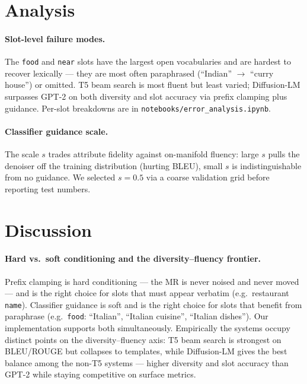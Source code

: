 \documentclass{llncs}
\begin{document}
\section{Analysis}
\label{sec:errors}

\paragraph{Slot-level failure modes.}
The \texttt{food} and \texttt{near} slots have the largest open vocabularies
and are hardest to recover lexically \cite{dusek2019semantic} --- they are
most often paraphrased (``Indian'' $\to$ ``curry house'') or omitted. T5 beam
search is most fluent but least varied; Diffusion-LM surpasses GPT-2 on both
diversity and slot accuracy via prefix clamping plus guidance. Per-slot
breakdowns are in \texttt{notebooks/error\_analysis.ipynb}.

\paragraph{Classifier guidance scale.}
The scale $s$ trades attribute fidelity against on-manifold fluency: large
$s$ pulls the denoiser off the training distribution (hurting BLEU), small
$s$ is indistinguishable from no guidance. We selected $s\!=\!0.5$ via a
coarse validation grid before reporting test numbers.

\section{Discussion}
\label{sec:discussion}

\paragraph{Hard vs.\ soft conditioning and the diversity--fluency
frontier.} Prefix clamping is hard conditioning --- the MR is never noised
and never moved --- and is the right choice for slots that must appear
verbatim (e.g.\ restaurant \texttt{name}). Classifier guidance is soft
and is the right choice for slots that benefit from paraphrase (e.g.\
\texttt{food}: ``Italian'', ``Italian cuisine'', ``Italian dishes'').
Our implementation supports both simultaneously. Empirically the systems
occupy distinct points on the diversity--fluency axis: T5 beam search is
strongest on BLEU/ROUGE but collapses to templates, while Diffusion-LM gives
the best balance among the non-T5 systems --- higher diversity and slot
accuracy than GPT-2 while staying competitive on surface metrics.
\end{document}
